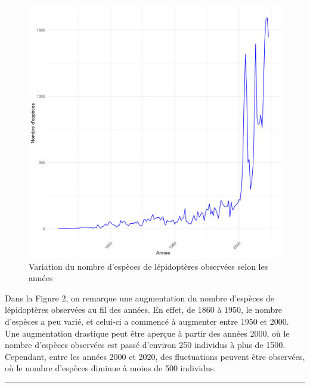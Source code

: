 \documentclass[9pt,twocolumn,twoside,]{pnas-new}
\begin{document}
\begin{figure}[H]

{\centering \includegraphics[width=0.8\linewidth]{graphique_richesse} 

}

\caption{ Variation du nombre d’espèces de lépidoptères observées selon les années}\label{fig:fig2}
\end{figure}

Dans la Figure 2, on remarque une augmentation du nombre d'espèces de
lépidoptères observées au fil des années. En effet, de 1860 à 1950, le
nombre d'espèces a peu varié, et celui-ci a commencé à augmenter entre
1950 et 2000. Une augmentation drastique peut être aperçue à partir des
années 2000, où le nombre d'espèces observées est passé d'environ 250
individus à plus de 1500. Cependant, entre les années 2000 et 2020, des
fluctuations peuvent être observées, où le nombre d'espèces diminue à
moins de 500 individus.

\begin{center}\rule{0.5\linewidth}{0.5pt}\end{center}
\end{document}

